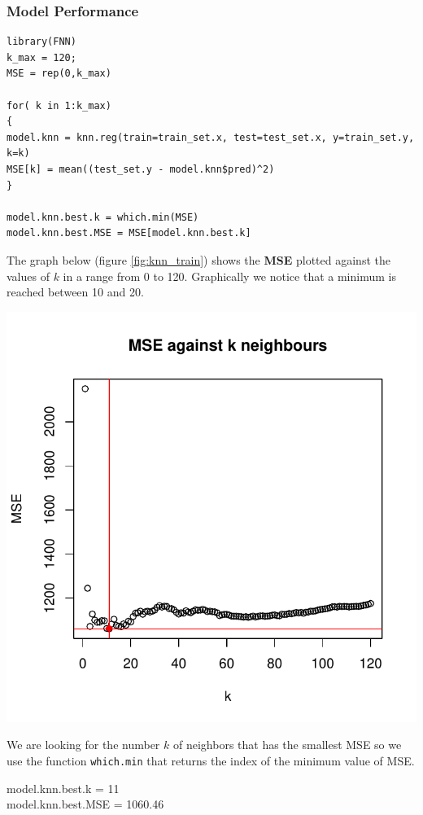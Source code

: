 \documentclass[]{report}
\begin{document}
\subsubsection{Model Performance}
\begin{lstlisting}
library(FNN)
k_max = 120;
MSE = rep(0,k_max)

for( k in 1:k_max)
{
model.knn = knn.reg(train=train_set.x, test=test_set.x, y=train_set.y, k=k)
MSE[k] = mean((test_set.y - model.knn$pred)^2)
}

model.knn.best.k = which.min(MSE)
model.knn.best.MSE = MSE[model.knn.best.k] 
\end{lstlisting}

The graph below (figure \ref{fig:knn_train}) shows the \textbf{ MSE} plotted against the values of $k$ in a range from 0 to 120. Graphically we notice that a minimum is reached between 10 and 20.

\begin{center}	
	\includegraphics[width=0.9\linewidth]{Figures/knn_test.pdf}
	\label{fig:knn_train}
\end{center}

We are looking for the number $k$ of neighbors that has the smallest MSE so we use the function \texttt{which.min} that returns the index of the minimum value of MSE.\\

\begin{center} 
	model.knn.best.k   = 11 \\
	model.knn.best.MSE = 1060.46
\end{center}
\end{document}
